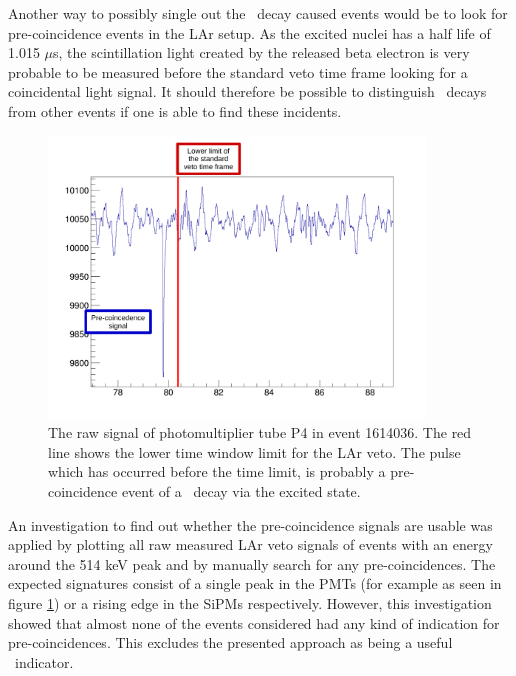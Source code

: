 \documentclass[encoding=utf8,british]{tumphthesis}
\begin{document}
Another way to possibly single out the \Kr\ decay caused events would be to look for pre-coincidence events in the LAr setup.
As the excited  nuclei has a half life of 1.015 $\mu$s, the scintillation light created by the released beta electron is very probable to be measured before the standard veto time frame looking for a coincidental light signal.
It should therefore be possible to distinguish \Kr\ decays from other events if one is able to find these incidents.
\\


\begin{figure}[t!]
	\centering
	\ifmakefigures%
	\includegraphics[width=100mm]{./Bilder/Beispiel.pdf}
	\fi%

	\caption{
    The raw signal of photomultiplier tube P4 in event 1614036. 
    The red line shows the lower time window limit for the LAr veto.
    The pulse which has occurred before the time limit, is probably a pre-coincidence event of a \Kr\ decay via the excited  state.
    }
    	\label{fig:BeispielSignal}
    			\vspace{5mm}
\end{figure}


An investigation to find out whether the pre-coincidence signals are usable was applied by plotting all raw measured LAr veto signals of events with an energy around the 514 keV peak and by manually search for any pre-coincidences.
The expected signatures consist of a single peak in the PMTs (for example as seen in figure \ref{fig:BeispielSignal}) or a rising edge in the SiPMs respectively.
However, this investigation showed that almost none of the events considered had any kind of indication for pre-coincidences.
This excludes the presented approach as being a useful \Kr\ indicator.

\iffalse
\end{document}
